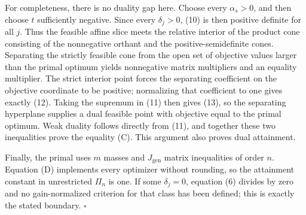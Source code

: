 For completeness, there is no duality gap here.  Choose every \(\alpha_s>0\), and then choose \(t\) sufficiently negative.  Since every \(\delta_j>0\), (10) is then positive definite for all \(j\).  Thus the feasible affine slice meets the relative interior of the product cone consisting of the nonnegative orthant and the positive-semidefinite cones.  Separating the strictly feasible cone from the open set of objective values larger than the primal optimum yields nonnegative matrix multipliers and an equality multiplier.  The strict interior point forces the separating coefficient on the objective coordinate to be positive; normalizing that coefficient to one gives exactly (12).  Taking the supremum in (11) then gives (13), so the separating hyperplane supplies a dual feasible point with objective equal to the primal optimum.  Weak duality follows directly from (11), and together these two inequalities prove the equality (C).  This argument also proves dual attainment.

Finally, the primal uses \(m\) masses and \(J_{\mathrm{gen}}\) matrix inequalities of order \(n\).  Equation (D) implements every optimizer without rounding, so the attainment constant in unrestricted \(\Pi_n\) is one.  If some \(\delta_j=0\), equation (6) divides by zero and no gain-normalized criterion for that class has been defined; this is exactly the stated boundary. \(\square\)